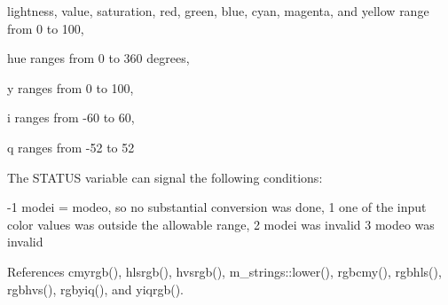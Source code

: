 \begin{DoxyDescription}
\begin{DoxyItemize}
\item lightness, value, saturation, red, green, blue, cyan, magenta, and yellow range from 0 to 100, 
\item hue ranges from 0 to 360 degrees, 
\item y ranges from 0 to 100, 
\item i ranges from -\/60 to 60, 
\item q ranges from -\/52 to 52 
\end{DoxyItemize}



The S\+T\+A\+T\+US variable can signal the following conditions\+: 




\begin{DoxyPre}
    -1   modei = modeo, so no substantial conversion was done,
     1   one of the input color values was outside the allowable range,
     2   modei was invalid
     3   modeo was invalid
 \end{DoxyPre}
 


\end{DoxyDescription}

References cmyrgb(), hlsrgb(), hvsrgb(), m\+\_\+strings\+::lower(), rgbcmy(), rgbhls(), rgbhvs(), rgbyiq(), and yiqrgb().


